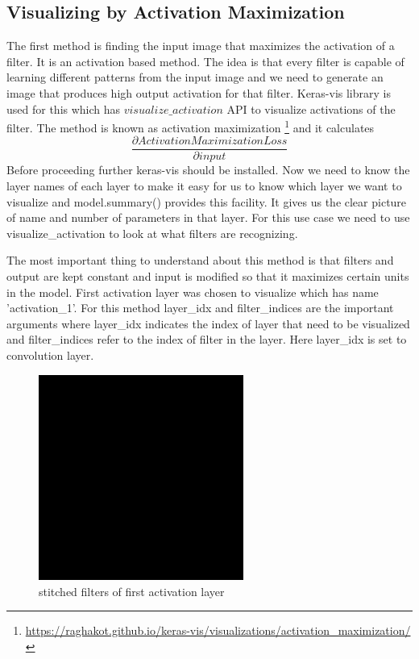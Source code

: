  \subsection{Visualizing by Activation Maximization} The first method is finding the input image that maximizes the activation of a filter. It is an activation based method. The idea is that every filter is capable of learning different patterns from the input image and we need to generate an image that produces high output activation for that filter. Keras-vis library is used for this which has $visualize\_activation$ API to visualize activations of the filter. The method is known as activation maximization \footnote{\url{https://raghakot.github.io/keras-vis/visualizations/activation_maximization/}} and it calculates $$ \frac{\partial ActivationMaximization Loss}{\partial input}$$ 
Before proceeding further keras-vis should be installed. Now we need to know the layer names of each layer to make it easy for us to know which layer we want to visualize and model.summary() provides this facility. It gives us the clear picture of name and number of parameters in that layer. For this use case we need to use visualize\_activation to look at what filters are recognizing. 

 \noindent The most important thing to understand about this method is that filters and output are kept constant and input is modified so that it maximizes certain units in the model. First activation layer was chosen to visualize which has name 'activation\_1'. For this method layer\_idx and filter\_indices are the important arguments where layer\_idx indicates the index of layer that need to be visualized and filter\_indices refer to the index of filter in the  layer. Here layer\_idx is set to convolution layer. 

\begin{figure}[h]
    \centering
    \includegraphics[width=0.6\textwidth]{thesis_template/images/stitchedfilter.png}
    \caption{\small stitched filters of first activation layer}
    \label{}
    \end{figure}

